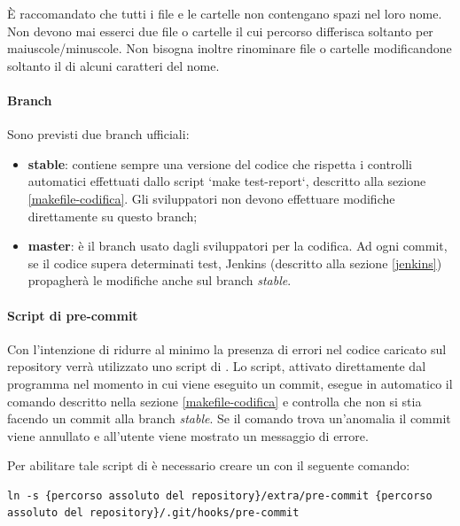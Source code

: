 È raccomandato che tutti i file e le cartelle non contengano spazi nel loro nome. Non devono mai esserci due file o cartelle il cui percorso differisca soltanto per maiuscole/minuscole. Non bisogna inoltre rinominare file o cartelle modificandone soltanto il  di alcuni caratteri del nome.

\paragraph{Branch}

Sono previsti due branch ufficiali:
\begin{itemize}
\item \textbf{stable}: contiene sempre una versione del codice che rispetta i controlli automatici effettuati dallo script `make test-report`, descritto alla sezione \ref{makefile-codifica}. Gli sviluppatori non devono effettuare modifiche direttamente su questo branch;

\item \textbf{master}: è il branch usato dagli sviluppatori per la codifica. Ad ogni commit, se il codice supera determinati test, Jenkins (descritto alla sezione \ref{jenkins}) propagherà le modifiche anche sul branch \emph{stable}.
\end{itemize}

\paragraph{Script di pre-commit}

Con l'intenzione di ridurre al minimo la presenza di errori nel codice caricato sul repository verrà utilizzato uno script di . Lo script, attivato direttamente dal programma  nel momento in cui viene eseguito un commit, esegue in automatico il comando  descritto nella sezione \ref{makefile-codifica} e controlla che non si stia facendo un commit alla branch \emph{stable}. Se il comando trova un'anomalia il commit viene annullato e all'utente viene mostrato un messaggio di errore.

Per abilitare tale script di  è necessario creare un  con il seguente comando:
\begin{lstlisting}
ln -s {percorso assoluto del repository}/extra/pre-commit {percorso assoluto del repository}/.git/hooks/pre-commit
\end{lstlisting}



